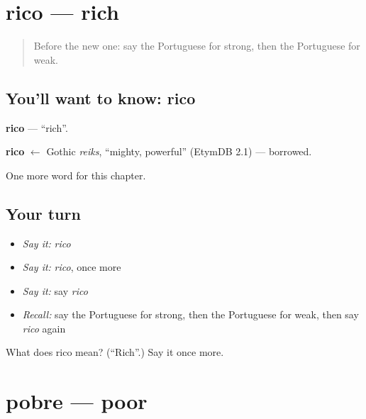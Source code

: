\section[rico]{rico — rich}

\label{lesson:PT-C68-rico}



\begin{quote}
Before the new one: say the Portuguese for strong, then the Portuguese for weak.
\end{quote}

\subsection*{You'll want to know: rico}
\textbf{rico} — \textquotedblleft{}rich\textquotedblright{}.

\begin{cousinweb}
\textbf{rico} $\leftarrow$ Gothic \emph{reiks}, \textquotedblleft{}mighty, powerful\textquotedblright{} (EtymDB 2.1) — borrowed.
\end{cousinweb}

\begin{grammarlens}[title={What you've built}]
One more word for this chapter.
\end{grammarlens}

\subsection*{Your turn}
\begin{itemize}
\raggedright
  \item \emph{Say it:} \emph{rico}
  \item \emph{Say it:} \emph{rico}, once more
  \item \emph{Say it:} say \emph{rico}
  \item \emph{Recall:} say the Portuguese for strong, then the Portuguese for weak, then say \emph{rico} again
\end{itemize}

\begin{tcolorbox}[breakable,colback=teal!4,colframe=teal!35!black,title={Before you move on}]
What does rico mean? (\textquotedblleft{}Rich\textquotedblright{}.) Say it once more.
\end{tcolorbox}
\section[pobre]{pobre — poor}

